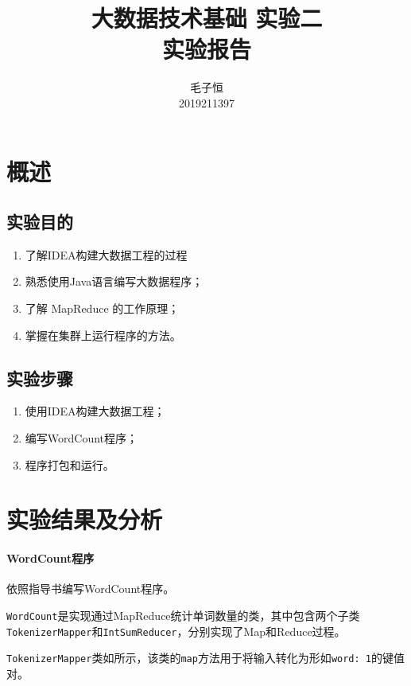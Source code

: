 \documentclass[lang=cn,11pt,a4paper,cite=authornum]{paper}
\title{大数据技术基础 实验二 \\ 实验报告}
\author{毛子恒 \\ 2019211397}
\institute{北京邮电大学\ 计算机学院}
\date{\zhtoday}
\begin{document}
\maketitle

\section{概述}

\subsection{实验目的}

\begin{enumerate}
    \item 了解IDEA构建大数据工程的过程
    \item 熟悉使用Java语言编写大数据程序；
    \item 了解 MapReduce 的工作原理；
    \item 掌握在集群上运行程序的方法。
\end{enumerate}

\subsection{实验步骤}

\begin{enumerate}
    \item 使用IDEA构建大数据工程；
    \item 编写WordCount程序；
    \item 程序打包和运行。
\end{enumerate}

\section{实验结果及分析}

\paragraph{WordCount程序}

依照指导书编写WordCount程序。

\texttt{WordCount}是实现通过MapReduce统计单词数量的类，其中包含两个子类\texttt{TokenizerMapper}和\texttt{IntSumReducer}，分别实现了Map和Reduce过程。

\texttt{TokenizerMapper}类如所示，该类的\texttt{map}方法用于将输入转化为形如\texttt{{word: 1}}的键值对。
\end{document}
